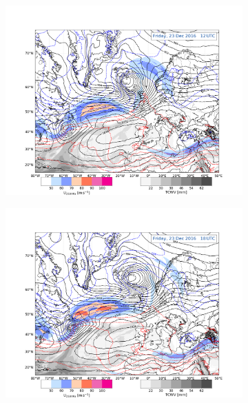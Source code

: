 \begin{figure}
	\begin{subfigure}[b]{0.49\textwidth}
		\includegraphics[trim={4.2cm 0cm 4.3cm 5.1cm},clip,
		width=\textwidth]{./fig_Geopot_Jet/20161223_12}
		\caption{} \label{fig:GP23}
	\end{subfigure}
	\begin{subfigure}[b]{0.49\textwidth}
		\includegraphics[trim={4.2cm 0cm 4.3cm 5.1cm},clip,
		width=\textwidth]{./fig_Geopot_Jet/20161223_18}
		\caption{} \label{fig:GP23_18}
	\end{subfigure}
	\begin{subfigure}[b]{0.49\textwidth}

\end{subfigure}
\end{figure}
